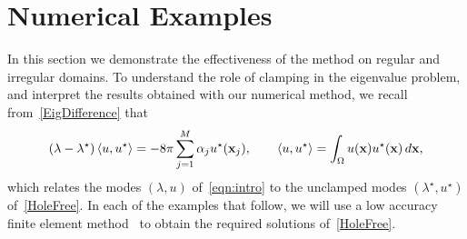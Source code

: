 \documentclass[times]{article}
\newcommand{\xx}{\mathbf{x}}
\begin{document}

\section{Numerical Examples}
\label{sec:numerics}

In this section we demonstrate the effectiveness of the method on
regular and irregular domains. To understand the role of clamping in the
eigenvalue problem, and interpret the results obtained with our
numerical method, we recall from~\eqref{EigDifference} that
\begin{align*}
 (\lambda - \lambda^{\star}) \braket{u,u^{\star}} = 
  -8\pi\sum_{j=1}^M \alpha_j u^{\star}(\xx_j), \qquad 
  \braket{u,u^{\star}} = \int_{\Omega} u(\xx) u^{\star}(\xx)\, d\xx,
\end{align*}
which relates the modes $(\lambda,u)$ of~\eqref{eqn:intro} to the
unclamped modes $(\lambda^{\star},u^{\star})$ of~\eqref{HoleFree}.  In
each of the examples that follow, we will use a low accuracy finite
element method~\cite{KI78} to obtain the required solutions
of~\eqref{HoleFree}. 

\end{document}
